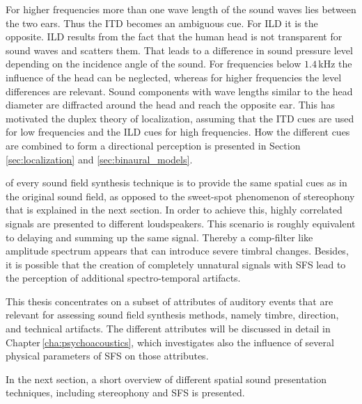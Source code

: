 For higher frequencies more than one wave length of the sound waves
lies between the two
ears. Thus the \ac{ITD} becomes an ambiguous cue. For \ac{ILD} it is the opposite.
\ac{ILD} results from the fact that the human head is not transparent for sound
waves and scatters them. That leads to a difference in sound pressure level
depending on the incidence angle of the sound. For frequencies below $1.4$\,kHz
the influence of the head can be neglected, whereas for higher frequencies the level
differences are relevant. Sound components with wave lengths similar to the head diameter are
diffracted around the head and reach the opposite ear.
This has motivated the duplex theory\autocite{Rayleigh1907} of localization,
assuming that the \ac{ITD} cues are used for low frequencies and the
\ac{ILD} cues for high frequencies. How the different cues are combined
to form a directional perception is presented in
Section\,\ref{sec:localization} and \ref{sec:binaural_models}.

 of every sound field synthesis technique is
to provide the same spatial cues as in the original sound field, as opposed
to the sweet-spot
phenomenon of stereophony that is explained in the next section. In order to
achieve this, highly correlated signals are presented to
different loudspeakers. This scenario is roughly equivalent to delaying and
summing up the same signal. Thereby a comp-filter like amplitude spectrum
appears that can introduce severe timbral changes.
Besides, it is possible that the creation of completely unnatural
signals with \ac{SFS} lead to the perception of
additional spectro-temporal artifacts.

This thesis concentrates on a subset of attributes of auditory events that are
relevant for assessing sound field synthesis methods, namely timbre, direction,
and technical artifacts. The different attributes will be discussed in detail in
Chapter\,\ref{cha:psychoacoustics}, which investigates also the influence of
several physical parameters of \ac{SFS} on those attributes.

In the next section, a short overview of different spatial sound presentation
techniques, including stereophony and \ac{SFS} is presented.


